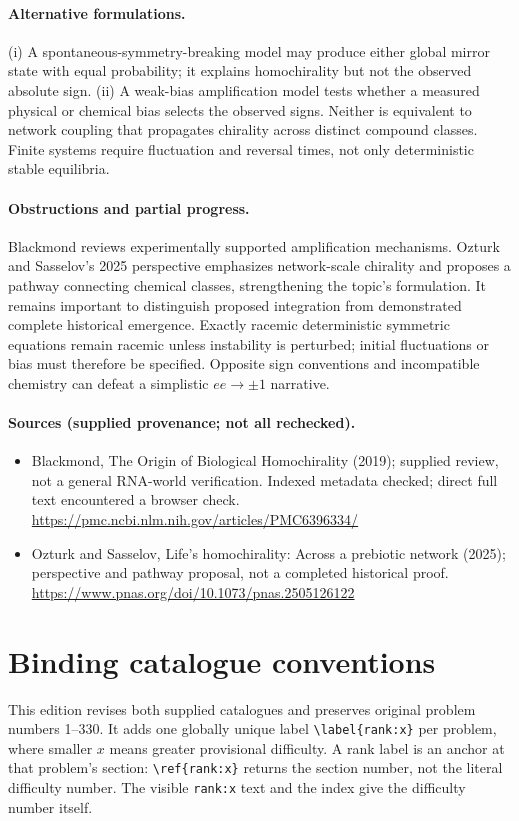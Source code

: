 \documentclass[11pt]{article}
\begin{document}
\paragraph{Alternative formulations.} (i) A spontaneous-symmetry-breaking model may produce either global mirror state with equal probability; it explains homochirality but not the observed absolute sign. (ii) A weak-bias amplification model tests whether a measured physical or chemical bias selects the observed signs. Neither is equivalent to network coupling that propagates chirality across distinct compound classes. Finite systems require fluctuation and reversal times, not only deterministic stable equilibria.

\paragraph{Obstructions and partial progress.} Blackmond reviews experimentally supported amplification mechanisms. Ozturk and Sasselov's 2025 perspective emphasizes network-scale chirality and proposes a pathway connecting chemical classes, strengthening the topic's formulation. It remains important to distinguish proposed integration from demonstrated complete historical emergence. Exactly racemic deterministic symmetric equations remain racemic unless instability is perturbed; initial fluctuations or bias must therefore be specified. Opposite sign conventions and incompatible chemistry can defeat a simplistic $ee\to\pm1$ narrative.

\paragraph{Sources (supplied provenance; not all rechecked).} \begin{itemize}
\item Blackmond, The Origin of Biological Homochirality (2019); supplied review, not a general RNA-world verification. Indexed metadata checked; direct full text encountered a browser check. \url{https://pmc.ncbi.nlm.nih.gov/articles/PMC6396334/}
\item Ozturk and Sasselov, Life's homochirality: Across a prebiotic network (2025); perspective and pathway proposal, not a completed historical proof. \url{https://www.pnas.org/doi/10.1073/pnas.2505126122}
\end{itemize}


\section*{Binding catalogue conventions}
This edition revises both supplied catalogues and preserves original problem numbers 1--330. It adds one globally unique label \verb|\label{rank:x}| per problem, where smaller $x$ means greater provisional difficulty. A rank label is an anchor at that problem's section: \verb|\ref{rank:x}| returns the section number, not the literal difficulty number. The visible \texttt{rank:x} text and the index give the difficulty number itself.
\end{document}
